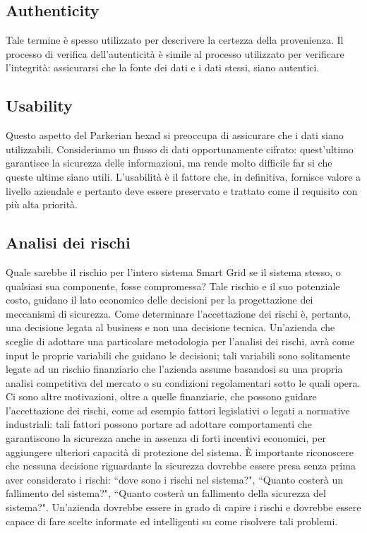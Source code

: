 \subsection{Authenticity}
Tale termine è spesso utilizzato per descrivere la certezza della provenienza. Il processo di verifica dell'autenticità è simile al processo utilizzato per verificare l'integrità: assicurarsi che la fonte dei dati e i dati stessi, siano autentici.

\subsection{Usability}
Questo aspetto del Parkerian hexad si preoccupa di assicurare che i dati siano utilizzabili. \newline Consideriamo un flusso di dati opportunamente cifrato: quest'ultimo garantisce la sicurezza delle informazioni, ma rende molto difficile far si che queste ultime siano utili. L'usabilità è il fattore che, in definitiva, fornisce valore a livello aziendale e pertanto deve essere preservato e trattato come il requisito con più alta priorità. 

\subsection{Analisi dei rischi}
Quale sarebbe il rischio per l'intero sistema Smart Grid se il sistema stesso, o qualsiasi sua componente, fosse compromessa? Tale rischio e il suo potenziale costo, guidano il lato economico delle decisioni per la progettazione dei meccanismi di sicurezza. \newline Come determinare l'accettazione dei rischi è, pertanto, una decisione legata al business e non una decisione tecnica. Un'azienda che sceglie di adottare una particolare metodologia per l'analisi dei rischi, avrà come input le proprie variabili che guidano le decisioni; tali variabili sono solitamente legate ad un rischio finanziario che l'azienda assume basandosi su una propria analisi competitiva del mercato o su condizioni regolamentari sotto le quali opera. \newline Ci sono altre motivazioni, oltre a quelle finanziarie, che possono guidare l'accettazione dei rischi, come ad esempio fattori legislativi o legati a normative industriali: tali fattori possono portare ad adottare comportamenti che garantiscono la sicurezza anche in assenza di forti incentivi economici, per aggiungere ulteriori capacità di protezione del sistema. \newline È importante riconoscere che nessuna decisione riguardante la sicurezza dovrebbe essere presa senza prima aver considerato i rischi: ``dove sono i rischi nel sistema?", ``Quanto costerà un fallimento del sistema?", ``Quanto costerà un fallimento della sicurezza del sistema?". Un'azienda dovrebbe essere in grado di capire i rischi e dovrebbe essere capace di fare scelte informate ed intelligenti su come risolvere tali problemi. 


